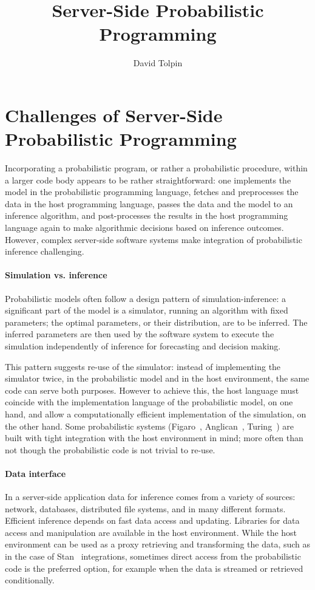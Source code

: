\documentclass[sigplan,review]{acmart}\settopmatter{printfolios=true,printccs=false,printacmref=false}
\title{Server-Side Probabilistic Programming}
\author{David Tolpin}
\affiliation{
    \institution{PUB+}
    \country{Israel}
}
\begin{document}
\maketitle

\begin{sloppypar}
\section{Challenges of Server-Side Probabilistic Programming}

Incorporating a probabilistic program, or rather a probabilistic
procedure, within a larger code body appears to be rather
straightforward: one implements the model in the probabilistic
programming language, fetches and preprocesses the data in the
host programming language, passes the data and the model to an
inference algorithm, and post-processes the results in the
host programming language again to make algorithmic
decisions based on inference outcomes. However, complex
server-side software systems make integration of probabilistic
inference challenging. 

\paragraph{Simulation vs. inference} Probabilistic models
often follow a design pattern of simulation-inference: a
significant part of the model is a simulator, running an
algorithm with fixed parameters; the optimal parameters, or
their distribution, are to be inferred. The inferred parameters
are then used by the software system to execute the simulation
independently of inference for forecasting and decision making.

This pattern suggests re-use of the simulator: instead of
implementing the simulator twice, in the probabilistic model and
in the host environment, the same code can serve both purposes.
However to achieve this, the host language must coincide with
the implementation language of the probabilistic model, on one
hand, and allow a computationally efficient implementation of
the simulation, on the other hand. Some probabilistic systems
(Figaro~\cite{P09}, Anglican~\cite{TMY+16}, Turing~\cite{GXG18})
are built with tight integration with the host environment in
mind; more often than not though the probabilistic code is
not trivial to re-use.

\paragraph{Data interface} In a server-side application data
for inference comes from a variety of sources: network,
databases, distributed file systems, and in many different
formats. Efficient inference depends on fast data access and
updating. Libraries for data access and manipulation are
available in the host environment. While the host environment
can be used as a proxy retrieving and transforming the data,
such as in the case of Stan~\cite{Stan17} integrations,
sometimes direct access from the probabilistic code is the
preferred option, for example when the data is streamed or
retrieved conditionally. 


\end{sloppypar}
\end{document}
